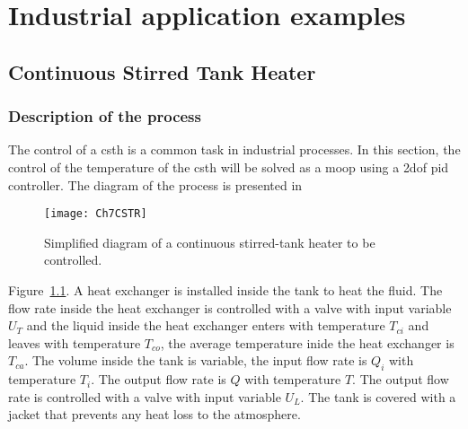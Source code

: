 \chapter{Industrial application examples}
\label{chap:ApplicationExamples}
%
%

%
\section{Continuous Stirred Tank Heater}
\label{sec:CSTH}
%
\subsection{Description of the process}
\label{sec:DescriptionCSTH}
%
The control of a \gls{csth} is a common task in industrial processes. In this section, the control of the temperature of the \gls{csth} will be solved as a \gls{moop} using a \gls{2dof} \gls{pid} controller. The diagram of the process is presented in %
\begin{figure}[b]
	\centering
	\texttt{[image: Ch7CSTR]}
	\caption{Simplified diagram of a continuous stirred-tank heater to be controlled.}
	\label{fig:Ch7CSTR}
\end{figure}
Figure~\ref{fig:Ch7CSTR}. A heat exchanger is installed inside the tank to heat the fluid. The flow rate inside the heat exchanger is controlled with a valve with input variable $U_T$ and the liquid inside the heat exchanger enters with temperature $T_{ci}$ and leaves with temperature $T_{co}$, the average temperature inide the heat exchanger is $T_{ca}$. The volume inside the tank is variable, the input flow rate is $Q_i$ with temperature $T_i$. The output flow rate is $Q$ with temperature $T$. The output flow rate is controlled with a valve with input variable $U_L$. The tank is covered with a jacket that prevents any heat loss to the atmosphere.

